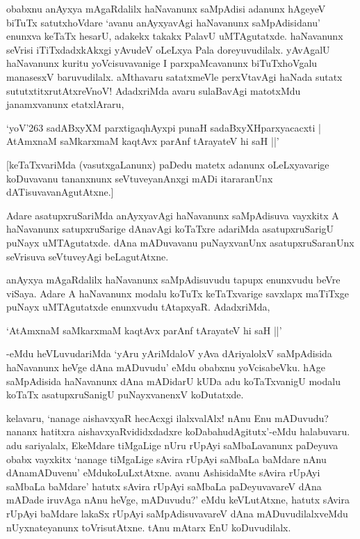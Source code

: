 obabxnu anAyxya mAgaRdalilx haNavanunx saMpAdisi adanunx hAgeyeV biTuTx satutxhoVdare `avanu anAyxyavAgi haNavanunx saMpAdisidanu' enunxva keTaTx hesarU, adakekx takakx PalavU uMTAgutatxde. haNavanunx seVrisi iTiTxdadxkAkxgi yAvudeV oLeLxya Pala doreyuvudilalx. yAvAgalU haNavanunx kuritu yoVcisuvavanige I parxpaMcavanunx biTuTxhoVgalu manasesxV baruvudilalx. aMthavaru satatxmeVle perxVtavAgi haNada sutatx sututxtitxrutAtxreVnoV! AdadxriMda avaru sulaBavAgi matotxMdu janamxvanunx etatxlAraru,

\begin{shloka}
`yoV\char'263 sadABxyXM parxtigaqhAyxpi punaH sadaBxyXHparxyacacxti |\\
AtAmxnaM saMkarxmaM kaqtAvx parAnf tArayateV hi saH ||'
\end{shloka}

[keTaTxvariMda (vasutxgaLanunx) paDedu matetx adanunx oLeLxyavarige koDuvavanu tananxnunx seVtuveyanAnxgi mADi itararanUnx dATisuvavanAgutAtxne.]

Adare asatupxruSariMda anAyxyavAgi haNavanunx saMpAdisuva vayxkitx A haNavanunx satupxruSarige dAnavAgi koTaTxre adariMda asatupxruSarigU puNayx uMTAgutatxde. dAna mADuvavanu puNayxvanUnx asatupxruSaranUnx seVrisuva seVtuveyAgi beLagutAtxne.

anAyxya mAgaRdalilx haNavanunx saMpAdisuvudu tapupx enunxvudu beVre viSaya. Adare A haNavanunx modalu koTuTx keTaTxvarige savxlapx maTiTxge puNayx uMTAgutatxde enunxvudu tAtapxyaR. AdadxriMda,

\begin{shloka}
`AtAmxnaM saMkarxmaM kaqtAvx parAnf tArayateV hi saH ||'
\end{shloka}

-eMdu heVLuvudariMda `yAru yAriMdaloV yAva dAriyalolxV saMpAdisida haNavanunx heVge dAna mADuvudu' eMdu obabxnu yoVcisabeVku. hAge saMpAdisida haNavanunx dAna mADidarU kUDa adu koTaTxvanigU modalu koTaTx asatupxruSanigU puNayxvanenxV koDutatxde.

kelavaru, `nanage aishavxyaR hecAcxgi ilalxvalAlx! nAnu Enu mADuvudu? nananx hatitxra aishavxyaRvididxdadxre koDabahudAgitutx'-eMdu halabuvaru. adu sariyalalx, EkeMdare tiMgaLige nUru rUpAyi saMbaLavanunx paDeyuva obabx vayxkitx `nanage tiMgaLige sAvira rUpAyi saMbaLa baMdare nAnu dAnamADuvenu' eMdukoLuLxtAtxne. avanu AshisidaMte sAvira rUpAyi saMbaLa baMdare' hatutx sAvira rUpAyi saMbaLa paDeyuvavareV dAna mADade iruvAga nAnu heVge, mADuvudu?' eMdu keVLutAtxne, hatutx sAvira rUpAyi baMdare lakaSx rUpAyi saMpAdisuvavareV dAna mADuvudilalxveMdu nUyxnateyanunx toVrisutAtxne. tAnu mAtarx EnU koDuvudilalx.

